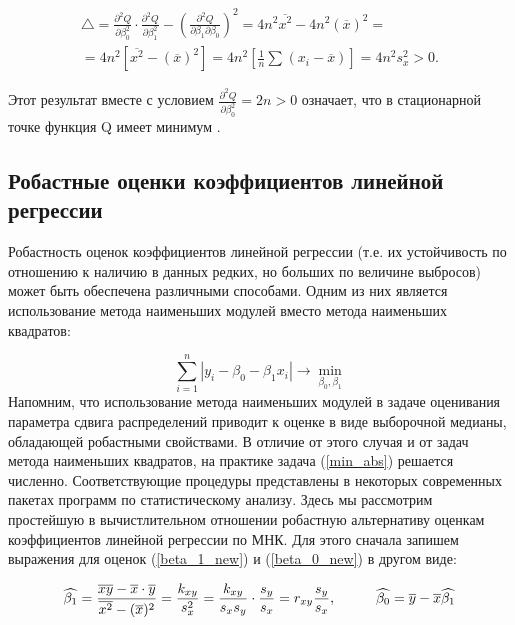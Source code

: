 \documentclass[../body.tex]{subfiles}
\begin{document}
	\begin{multline}
		\bigtriangleup = \frac{\partial^{2}Q}{\partial \beta_{0}^{2}} \cdot \frac{\partial^{2}Q}{\partial \beta_{1}^{2}} - (\frac{\partial^{2}Q}{\partial \beta_{1} \partial \beta_{0}})^{2} = 
		4n^{2}\overline{x^{2}} - 4n^2(\overline{x})^{2} = \\
		= 4n^{2}\left[\overline{x^{2}} - (\overline{x})^{2}\right] = 4n^{2}\left[ \frac{1}{n}\sum{}_{}{(x_{i} - \overline{x})}\right] = 4n^{2}s_{x}^{2} > 0.
		\label{det_sys}
	\end{multline}
	
	Этот результат вместе с условием $\frac{\partial^{2}Q}{\partial \beta_{0}^{2}} = 2n > 0$ означает, что в стационарной точке функция Q имеет минимум \cite[c.~508-511]{max}.
	
	
	
	
	
	
	
	
	\subsection{Робастные оценки коэффициентов линейной регрессии}
	Робастность оценок коэффициентов линейной регрессии (т.е. их устойчивость по отношению к наличию в данных редких, но больших по величине выбросов) может быть обеспечена различными способами. Одним из них является использование метода наименьших модулей вместо метода наименьших квадратов:
	
	\begin{equation}
		\sum_{i=1}^{n}{|y_{i} - \beta_{0} - \beta_{1}x_{i}|}\rightarrow \min_{\beta_{0}, \beta_{1}}
		\label{min_abs}
	\end{equation}
	Напомним, что использование метода наименьших модулей в задаче оценивания параметра сдвига распределений приводит к оценке в виде выборочной медианы, обладающей робастными свойствами. В отличие от этого случая и от задач метода наименьших квадратов, на практике задача (\ref{min_abs}) решается численно. Соответствующие процедуры представлены в некоторых современных пакетах программ по статистическому анализу.
	\newline \newline
	Здесь мы рассмотрим простейшую в вычистлительном отношении робастную альтернативу оценкам коэффициентов линейной регрессии по МНК. Для этого сначала запишем выражения для оценок (\ref{beta_1_new}) и (\ref{beta_0_new}) в другом виде:
	
	\begin{equation}
		\widehat{\beta_1} = \frac{\overline{xy} - \overline{x} \cdot \overline{y}}{\overline{x^2} - (\overline{x})^{2}} = \frac{k_{xy}}{s_x^2} = \frac{k_{xy}}{s_x s_y} \cdot \frac{s_{y}}{s_x} = r_{xy}\frac{s_y}{s_x},\hspace{10mm}
		\widehat{\beta_{0}} = \overline{y} - \overline{x}\widehat{\beta_1}
		\label{new_coef_abs}
	\end{equation}
	
\end{document}

